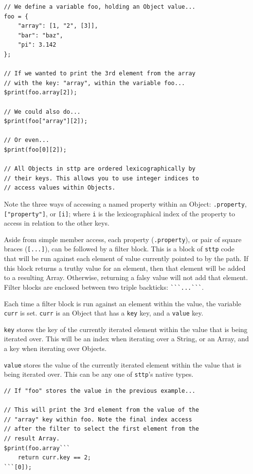 \documentclass[]{full}
\theoremstyle{definition}
\begin{document}
\begin{verbatim}
// We define a variable foo, holding an Object value...
foo = {
    "array": [1, "2", [3]],
    "bar": "baz",
    "pi": 3.142
};

// If we wanted to print the 3rd element from the array
// with the key: "array", within the variable foo...
$print(foo.array[2]);

// We could also do...
$print(foo["array"][2]);

// Or even...
$print(foo[0][2]);

// All Objects in sttp are ordered lexicographically by
// their keys. This allows you to use integer indices to
// access values within Objects.
\end{verbatim}

Note the three ways of accessing a named property within an Object: \verb|.property|, \verb|["property"]|, or \verb|[i]|; where \verb|i| is the lexicographical index of the property to access in relation to the other keys.

Aside from simple member access, each property (\verb|.property|), or pair of square braces (\verb|[...]|), can be followed by a filter block. This is a block of \verb|sttp| code that will be run against each element of value currently pointed to by the path. If this block returns a truthy value for an element, then that element will be added to a resulting Array. Otherwise, returning a falsy value will not add that element. Filter blocks are enclosed between two triple backticks: \verb|```...```|.

Each time a filter block is run against an element within the value, the variable \verb|curr| is set. \verb|curr| is an Object that has a \verb|key| key, and a \verb|value| key.

\verb|key| stores the key of the currently iterated element within the value that is being iterated over. This will be an index when iterating over a String, or an Array, and a key when iterating over Objects.

\verb|value| stores the value of the currently iterated element within the value that is being iterated over. This can be any one of \verb|sttp|'s native types.

\begin{verbatim}
// If "foo" stores the value in the previous example...

// This will print the 3rd element from the value of the
// "array" key within foo. Note the final index access 
// after the filter to select the first element from the
// result Array.
$print(foo.array```
    return curr.key == 2;
```[0]);
\end{verbatim}
\end{document}
